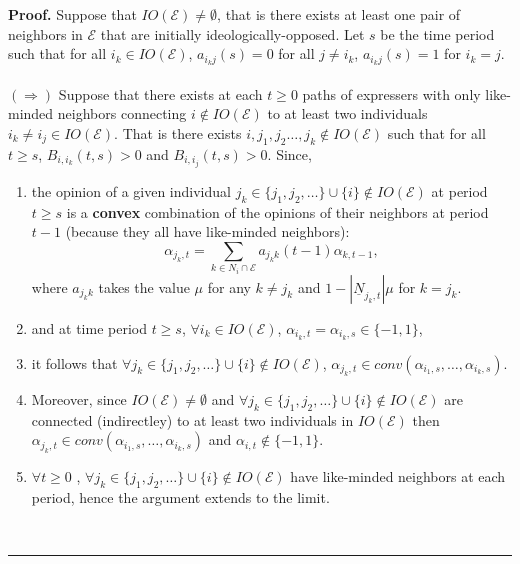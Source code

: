 \documentclass{article}
\newenvironment{proof}[1][Proof]{\textbf{#1.} }{\ \rule{0.5em}{0.5em}}
\begin{document}
\noindent \begin{proof} Suppose that $ IO(\mathcal{E}) \neq \emptyset$, that is there exists at least one pair of neighbors in $\mathcal{E}$ that are initially ideologically-opposed. Let $s$ be the time period such that for all $i_k \in IO(\mathcal{E})$, $a_{i_k j} (s)=0$ for all $j \neq i_k$, $a_{i_k j} (s)=1$ for $i_k =j$. \\
\\ $(\Rightarrow)$ Suppose that there exists at each $t \geq 0$ paths of expressers with only like-minded neighbors connecting $i \not \in IO(\mathcal{E})$ to at least two individuals $i_k \neq i_j \in IO(\mathcal{E})$. That is there exists $i, j_1, j_2 \ldots , j_k \not \in IO(\mathcal{E}) $ such that for all $t \geq s$, $B_{i , i_k} (t,s) > 0 $ and $B_{i , i_j} (t,s) > 0 $.  Since, 
\begin{enumerate}
\item the opinion of a given individual $j_k \in \{j_1, j_2, \ldots \} \cup \{ i\} \not \in IO(\mathcal{E}) $ at period $t \geq s$ is a \textbf{convex} combination of the opinions of their neighbors at period $t-1$ (because they all have like-minded neighbors):
\begin{equation*}
\alpha_{j_k,t} = \sum_{k \in N_i \cap \mathcal{E}} a_{j_k k} (t-1) \alpha_{k,t-1}, %
\end{equation*}
where $a_{j_k k}$ takes the value $\mu$ for any  $k \neq j_k$ and $1 - |\underline{N}_{j_k,t}| \mu$ for $k=j_k$. 
\item and at time period $t \geq s$, $\forall i_k \in IO(\mathcal{E})$, 
$\alpha_{i_k,t} = \alpha_{i_k , s} \in \{ -1 , 1 \}$,
\item it follows that $\forall j_k \in \{j_1, j_2, \ldots \} \cup \{ i\} \not \in IO(\mathcal{E}) $, $\alpha_{j_k,t} \in {conv}{(\alpha_{i_1,s} , \ldots , \alpha_{i_k,s} )}$.
\item Moreover, since $ IO(\mathcal{E}) \neq \emptyset$ and $\forall j_k \in \{j_1, j_2, \ldots \} \cup \{ i\} \not \in IO(\mathcal{E}) $ are connected (indirectley) to at least two individuals in $IO(\mathcal{E}) $   then $\alpha_{j_k,t} \in {conv}{(\alpha_{i_1,s} , \ldots , \alpha_{i_k,s} )}$ and $\alpha_{i,t} \not \in \{ -1 , 1 \}$.
\item $\forall t\geq 0$ , $\forall j_k \in \{j_1, j_2, \ldots \} \cup \{ i\} \not \in IO(\mathcal{E}) $ have like-minded neighbors at each period, hence the argument extends to the limit. %
\end{enumerate} \end{proof}
\end{document}
